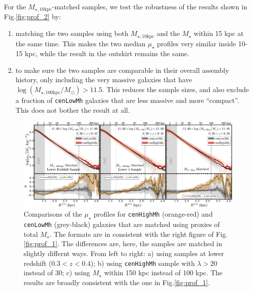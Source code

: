 \documentclass{emulateapj}
\def\rbcg{\texttt{cenHighMh}}
\def\nbcg{\texttt{cenLowMh}}
\def\mstar{{$M_{\star}$}}
\def\minn{{$M_{\star,10\mathrm{kpc}}$}}
\def\logmtot{{$\log (M_{\star,100\mathrm{kpc}}/M_{\odot})$}}
\def\mden{{$\mu_{\star}$}}
\newcommand{\update}[1]{\textcolor{Bittersweet}{#1}}
\begin{document}
\begin{CJK*}{UTF8}{gbsn}
    \update{
    For the \minn{}-matched samples, we test the robustness of the results shown in 
    Fig.\ref{fig:prof_2} by: 
    }
    
    \begin{enumerate}
        \item \update{
            matching the two samples using both \minn{} and the \mstar{} within 15 kpc 
            at the same time.  
            This makes the two median \mden{} profiles very similar inside 10-15 
            kpc, while the result in the outskirt remains the same.
            }
        \item \update{
            to make sure the two samples are comparable in their overall assembly history,
            only including the very massive galaxies that have \logmtot{}$>11.5$. 
            This reduces the sample sizes, and also exclude a fraction of \nbcg{} galaxies
            that are less massive and more ``compact''.  
            This does not bother the result at all.
            }
    \end{enumerate}
 
  \begin{figure}[t!]
      \centering 
      \includegraphics[width=\textwidth]{fig/redbcg_prof_3}
      \caption{Comparisons of the \mden{} profiles for \rbcg{} (orange-red) and \nbcg{} 
      	(grey-black) galaxies that are matched using proxies of total \mstar{}. 
        The formats are in consistent with the right figure of Fig.\ref{fig:prof_1}.
        The differences are, here, the samples are matched in slightly differnt ways. 
        From left to right: a) using samples at lower redshift ($0.3 < z < 0.4$); 
        b) using \rbcg{} sample with $\lambda > 20$ instead of 30; 
        c) using \mstar{} within 150 kpc instead of 100 kpc.
        The results are broadly consistent with the one in Fig.\ref{fig:prof_1}.}
      \label{fig:prof_3} 
  \end{figure}


\end{CJK*}
\end{document}
